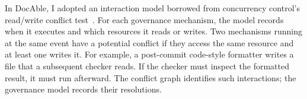 In DocAble, I adopted an interaction model borrowed from concurrency control's read/write conflict test~\citep{bernstein1981concurrency}. For each governance mechanism, the model records when it executes and which resources it reads or writes. Two mechanisms running at the same event have a potential conflict if they access the same resource and at least one writes it. For example, a post-commit code-style formatter writes a file that a subsequent checker reads. If the checker must inspect the formatted result, it must run afterward. The conflict graph identifies such interactions; the governance model records their resolutions.
